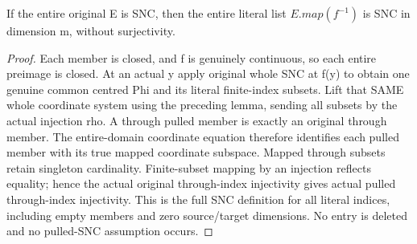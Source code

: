 \begin{theorem}
\label{hir:submersion-nc-entire-snc-preimage}
\leanok
If the entire original E is SNC, then the entire literal list
$E.map(f^{-1})$ is SNC in dimension m, without surjectivity.
\end{theorem}
\begin{proof}
Each member is closed, and f is genuinely continuous, so each entire
preimage is closed. At an actual y apply original whole SNC at f(y) to
obtain one genuine common centred Phi and its literal finite-index subsets.
Lift that SAME whole coordinate system using the preceding lemma, sending
all subsets by the actual injection rho. A through pulled member is exactly
an original through member. The entire-domain coordinate equation therefore
identifies each pulled member with its true mapped coordinate subspace.
Mapped through subsets retain singleton cardinality. Finite-subset mapping
by an injection reflects equality; hence the actual original through-index
injectivity gives actual pulled through-index injectivity. This is the full
SNC definition for all literal indices, including empty members and zero
source/target dimensions. No entry is deleted and no pulled-SNC assumption
occurs.
\end{proof}

